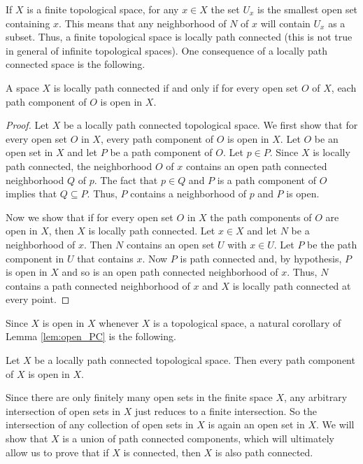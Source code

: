 If $X$ is a finite topological space, for any $x \in X$ the set $U_x$ is the smallest open set containing $x$. This means that any neighborhood of $N$ of $x$ will contain $U_x$ as a subset. Thus, a finite topological space is locally path connected (this is not true in general of infinite topological spaces). One consequence of a locally path connected space is the following.

\begin{lemma} \label{lem:open_PC} A space $X$ is locally path connected if and only if for every open set $O$ of $X$, each path component of $O$ is open in $X$.
\end{lemma}

\begin{proof} Let $X$ be a locally path connected topological space. We first show that for every open set $O$ in $X$, every path component of $O$ is open in $X$. Let $O$ be an open set in $X$ and let $P$ be a path component of $O$. Let $p \in P$. Since $X$ is locally path connected, the neighborhood $O$ of $x$ contains an open path connected neighborhood $Q$ of $p$. The fact that $p \in Q$ and $P$ is a path component of $O$ implies that $Q \subseteq P$. Thus, $P$ contains a neighborhood of $p$ and $P$ is open. 

Now we show that if for every open set $O$ in $X$ the path components of $O$ are open in $X$, then $X$ is locally path connected. Let $x \in X$ and let $N$ be a neighborhood of $x$. Then $N$ contains an open set $U$ with $x \in U$. Let $P$ be the path component in $U$ that contains $x$. Now $P$ is path connected and, by hypothesis, $P$ is open in $X$ and so is an open path connected neighborhood of $x$. Thus, $N$ contains a path connected neighborhood of $x$ and $X$ is locally path connected at every point.

\end{proof}

Since $X$ is open in $X$ whenever $X$ is a topological space, a natural corollary of Lemma \ref{lem:open_PC} is the following.

\begin{corollary} Let $X$ be a locally path connected topological space. Then every path component of $X$ is open in $X$. 
\end{corollary}
 
Since there are only finitely many open sets in the finite space $X$, any arbitrary intersection of open sets in $X$ just reduces to a finite intersection. So the intersection of any collection of open sets in $X$ is again an open set in $X$. We will show that $X$ is a union of path connected components, which will ultimately allow us to prove that if $X$ is connected, then $X$ is also path connected. 

